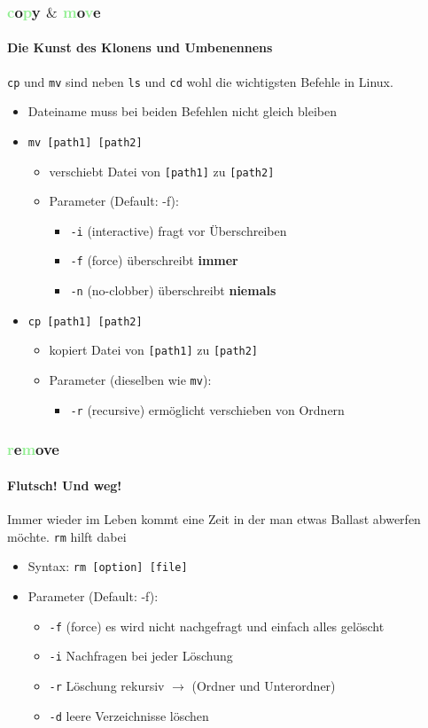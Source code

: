 \documentclass[12pt,utf8]{beamer}
\begin{document}
\begin{frame}
\frametitle{\textcolor{lightGreen}{c}o\textcolor{lightGreen}{p}y $\&$ \textcolor{lightGreen}{m}o\textcolor{lightGreen}{v}e}
\framesubtitle{Die Kunst des Klonens und Umbenennens}
\texttt{cp} und \texttt{mv} sind neben \texttt{ls} und \texttt{cd} wohl die wichtigsten Befehle in Linux.
\begin{itemize}
	\item Dateiname muss bei beiden Befehlen nicht gleich bleiben
	\item \texttt{mv [path1] [path2]}
	\begin{itemize}
		\item verschiebt Datei von \texttt{[path1]} zu \texttt{[path2]}
		\item Parameter (Default: -f):
		\begin{itemize}[<+->]
			\item {\scriptsize \texttt{-i} (interactive) fragt vor Überschreiben}
			\item {\scriptsize \texttt{-f} (force) überschreibt \textbf{immer}}
			\item {\scriptsize \texttt{-n} (no-clobber) überschreibt \textbf{niemals}}
		\end{itemize}
	\end{itemize}
	\item \texttt{cp [path1] [path2]}
	\begin{itemize}
		\item kopiert Datei von \texttt{[path1]} zu \texttt{[path2]}
		\item Parameter {\scriptsize (dieselben wie \texttt{mv})}:
		\begin{itemize}[<+->]
			\item {\scriptsize \texttt{-r} (recursive) ermöglicht verschieben von Ordnern}
		\end{itemize}
	\end{itemize}
\end{itemize}
\end{frame}

\begin{frame}
\frametitle{\textcolor{lightGreen}{r}e\textcolor{lightGreen}{m}ove}
\framesubtitle{Flutsch! Und weg!}
Immer wieder im Leben kommt eine Zeit in der man etwas Ballast abwerfen möchte.  
\texttt{rm} hilft dabei
\begin{itemize}
	\item Syntax: \texttt{rm [option] [file]}
	\item Parameter (Default: -f):
	\begin{itemize}[<+->]
		\item \texttt{-f} (force) es wird nicht nachgefragt und einfach alles gelöscht
		\item \texttt{-i} Nachfragen bei jeder Löschung
		\item \texttt{-r} Löschung rekursiv $\to$ (Ordner und Unterordner)
		\item \texttt{-d} leere Verzeichnisse löschen
	\end{itemize}
\end{itemize}
\end{frame}
\end{document}
